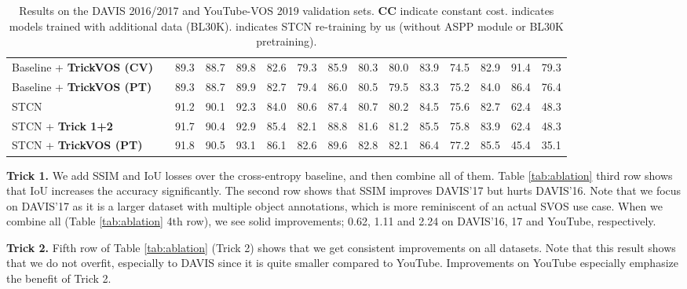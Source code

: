 \begin{table*}[t!]
{\begin{tabular}{lc|ccccccccccccc}
Baseline + \textbf{TrickVOS (CV)} &  & 89.3 & 88.7 & \multicolumn{1}{c|}{89.8} & 82.6 & 79.3 & \multicolumn{1}{c|}{85.9} & 80.3 & 80.0 & 83.9 & 74.5 & \multicolumn{1}{c|}{82.9} & 91.4  & 79.3 \\
Baseline + \textbf{TrickVOS (PT)} &  & 89.3 & 88.7 & \multicolumn{1}{c|}{89.9} & 82.7 &  79.4 & \multicolumn{1}{c|}{86.0} & 80.5 & 79.5 & 83.3 & 75.2 & \multicolumn{1}{c|}{84.0} & 86.4 & 76.4 \\ \hline
STCN  \cite{cheng2021rethinking} &  & 91.2 & 90.1 & \multicolumn{1}{c|}{92.3} & 84.0 & 80.6 & \multicolumn{1}{c|}{87.4} & 80.7 & 80.2 & 84.5 & 75.6 & \multicolumn{1}{c|}{82.7} & 62.4 & 48.3 \\
STCN  \cite{cheng2021rethinking} + \textbf{Trick 1+2} &  & 91.7 & 90.4 & \multicolumn{1}{c|}{92.9} & 85.4 & 82.1 & \multicolumn{1}{c|}{88.8} & 81.6 & 81.2 & 85.5 & 75.8 & \multicolumn{1}{c|}{83.9} & 62.4 & 48.3 \\
STCN  \cite{cheng2021rethinking} + \textbf{TrickVOS (PT)} &  & 91.8 & 90.5 & \multicolumn{1}{c|}{93.1} & 86.1 & 82.6 & \multicolumn{1}{c|}{89.6} & 82.8 & 82.1 & 86.4 & 77.2 & \multicolumn{1}{c|}{85.5} & 45.4 & 35.1 \\
\end{tabular}}
\vspace{-4mm}
    \caption{Results on the DAVIS 2016/2017 and YouTube-VOS 2019 validation sets. \textbf{CC} indicate constant cost. 
     indicates models trained with additional data (BL30K).  indicates STCN re-training by us (without ASPP module or BL30K pretraining).
    }
    \label{tab:sota_results}
    \vspace{-6mm}
\end{table*}


\noindent \textbf{Trick 1.} We add SSIM and IoU losses over the cross-entropy baseline, and then combine all of them. Table \ref{tab:ablation} third row shows that IoU increases the accuracy significantly. The second row shows that SSIM improves DAVIS'17 but hurts DAVIS'16. Note that we focus on DAVIS'17 as it is a larger dataset with multiple object annotations, which is more reminiscent of an actual SVOS use case. When we combine all (Table \ref{tab:ablation} 4th row), we see solid improvements; 0.62, 1.11  and 2.24  on DAVIS'16, 17 and YouTube, respectively.


\noindent \textbf{Trick 2.} Fifth row of Table \ref{tab:ablation} (Trick 2) shows that we get consistent improvements on all datasets. Note that this result shows that we do not overfit, especially to DAVIS since it is quite smaller compared to YouTube. Improvements on YouTube especially emphasize the benefit of Trick 2.


